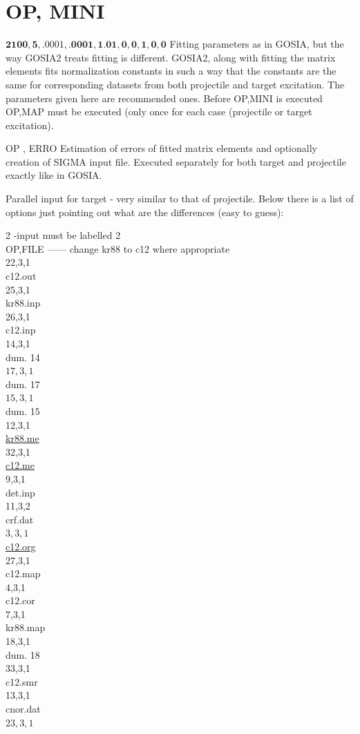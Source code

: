 \documentclass[10pt]{article}
\begin{document}
\section*{OP, MINI}
$\mathbf{2 1 0 0}, \mathbf{5}, .0001, . \mathbf{0 0 0 1}, \mathbf{1 . 0 1}, \mathbf{0}, \mathbf{0}, \mathbf{1}, \mathbf{0}, \mathbf{0}$ Fitting parameters as in GOSIA, but the way GOSIA2 treats fitting is different. GOSIA2, along with fitting the matrix elements fits normalization constants in such a way that the constants are the same for corresponding datasets from both projectile and target excitation. The parameters given here are recommended ones. Before OP,MINI is executed OP,MAP must be executed (only once for each case (projectile or target excitation).

OP , ERRO Estimation of errors of fitted matrix elements and optionally creation of SIGMA input file. Executed separately for both target and projectile exactly like in GOSIA.

Parallel input for target - very similar to that of projectile. Below there is a list of options just pointing out what are the differences (easy to guess):

2 -input must be labelled 2\\
OP,FILE —— change kr88 to c12 where appropriate\\
22,3,1\\
c12.out\\
25,3,1\\
kr88.inp\\
26,3,1\\
c12.inp\\
14,3,1\\
dum. 14\\
$17,3,1$\\
dum. 17\\
$15,3,1$\\
dum. 15\\
12,3,1\\
\href{http://kr88.me}{kr88.me}\\
32,3,1\\
\href{http://c12.me}{c12.me}\\
9,3,1\\
det.inp\\
11,3,2\\
crf.dat\\
$3,3,1$\\
\href{http://c12.org}{c12.org}\\
27,3,1\\
c12.map\\
4,3,1\\
c12.cor\\
7,3,1\\
kr88.map\\
18,3,1\\
dum. 18\\
33,3,1\\
c12.smr\\
13,3,1\\
cnor.dat\\
$23,3,1$
\end{document}
